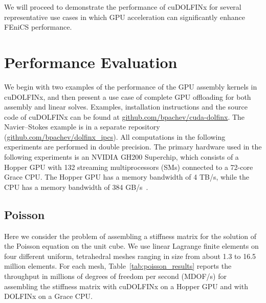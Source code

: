 We will proceed to demonstrate the performance of cuDOLFINx for several representative use cases in which GPU acceleration can significantly enhance FEniCS performance.

\section*{Performance Evaluation}
We begin with two examples of the performance of the GPU assembly kernels in cuDOLFINx, and then present a use case of complete GPU offloading for both assembly and linear solves. Examples, installation instructions and the source code of cuDOLFINx can be found at \href{https://github.com/bpachev/cuda-dolfinx}{github.com/bpachev/cuda-dolfinx}. The Navier--Stokes example is in a separate repository (\href{https://github.com/bpachev/dolfinx\_ipcs}{github.com/bpachev/dolfinx\_ipcs}). All computations in the following experiments are performed in double precision. The primary hardware used in the following experiments is an NVIDIA GH200 Superchip, which consists of a Hopper GPU with 132 streaming multiprocessors (SMs) connected to a 72-core Grace CPU. The Hopper GPU has a memory bandwidth of 4 TB/s, while the CPU has a memory bandwidth of 384 GB/s~\citep{gh200specs}.

\subsection*{Poisson}
%
Here we consider the problem of assembling a stiffness matrix for the solution of the Poisson equation on the unit cube. We use linear Lagrange finite elements on four different uniform, tetrahedral meshes ranging in size from about 1.3 to 16.5 million elements.  For each mesh, Table~\ref{tab:poisson_results} reports the throughput in millions of degrees of freedom per second (MDOF/s) for assembling the stiffness matrix with cuDOLFINx on a Hopper GPU and with DOLFINx on a Grace CPU.

